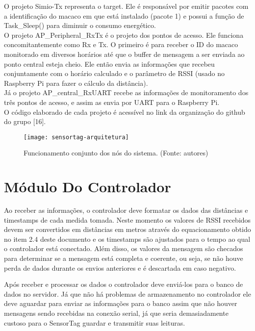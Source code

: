 O projeto Simio-Tx representa o target. Ele é responsável por emitir pacotes com a identificação do macaco em que está instalado (pacote 1) e possui a função de Task_Sleep() para diminuir o consumo energético. \\
O projeto AP_Peripheral_RxTx é o projeto dos pontos de acesso. Ele funciona concomitantemente como Rx e Tx. O primeiro é para receber o ID do macaco monitorado em diversos horários até que o buffer de mensagem a ser enviada ao ponto central esteja cheio. Ele então envia as informações que recebeu conjuntamente com o horário calculado e o parâmetro de RSSI (usado no Raspberry Pi para fazer o cálculo da distância). \\
Já o projeto AP_central_RxUART recebe as informações de monitoramento dos três pontos de acesso, e assim as envia por UART para o Raspberry Pi. \\
O código elaborado de cada projeto é acessível no link da organização do github do grupo [16].\\

\begin{figure}[ht]
  \centering
    \texttt{[image: sensortag-arquitetura]}
  \caption{ Funcionamento conjunto dos nós do sistema. (Fonte: autores)}
\end{figure}
\FloatBarrier 

\section{Módulo Do Controlador}

Ao receber as informações, o controlador deve formatar os dados das distâncias e timestamps de cada medida tomada. Neste momento os valores de RSSI recebidos devem ser convertidos em distâncias em metros através do equacionamento obtido no item 2.4 deste documento e os timestamps são ajustados para o tempo ao qual o controlador está conectado. Além disso, os valores da mensagem são checados para determinar se a mensagem está completa e coerente, ou seja, se não houve perda de dados durante os envios anteriores e é descartada em caso negativo.

Após receber e processar os dados o controlador deve enviá-los para o banco de dados no servidor. Já que não há problemas de armazenamento no controlador ele deve aguardar para enviar as informações para o banco assim que não houver mensagens sendo recebidas na conexão serial, já que seria demasiadamente custoso para o SensorTag guardar e transmitir suas leituras.

